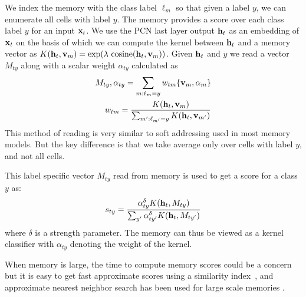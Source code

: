 \documentclass[letterpaper]{article} %
\newcommand{\vek}[1]{{\bf {#1}}}
\newcommand{\vx}{{\vek{x}}}
\newcommand{\vh}{{\vek{h}}}
\newcommand{\vM}{{\vek{v}}}
\newcommand{\util}{{\alpha}}
\newcommand{\lmm}{{s}}
\begin{document}
We index the memory with the class label $\ell_m$  so that given a label $y$, we can enumerate all cells with label $y$.  The memory provides a score over each class label $y$ for an input $\vx_t$.
We use the PCN last layer output $\vh_t$ as an embedding of $\vx_t$ on the basis of which we can compute the kernel  between $\vh_t$ and a memory vector as  $K(\vh_t,\vM_m) = \exp(\lambda ~\text{cosine}(\vh_t,\vM_m))$.
%
Given $\vh_t$ and $y$ we read a vector $M_{ty}$ along with a scalar weight $\alpha_{ty}$ calculated as
\begin{equation}
\label{eq-mem-read}
\begin{split}
 M_{ty},\alpha_{ty} = \sum_{m:\ell_m = y} w_{tm}\{\vM_m,\util_m\} \\
 w_{tm} =  \frac{K(\vh_t,\vM_m)}{\sum_{m': \ell_{m'} = y} K(\vh_t,\vM_{m'}) }
\end{split}
\end{equation}
This method of reading is very similar to soft addressing used in most memory models.  But the key difference is that we take average only over cells with label $y$, and not all cells.


This label specific vector $M_{ty}$ read from memory is used to get a score for a class $y$ as:
\begin{equation}
\label{eq-mem-score}
\lmm_{ty}  = \frac{\alpha_{ty}^\delta K(\vh_t, M_{ty})} { \sum_{y'} \alpha_{ty'}^\delta K(\vh_t, M_{ty'})}
\end{equation}
where $\delta$ is a strength parameter. The memory can thus be viewed as a kernel classifier with $\alpha_{ty}$ denoting the weight of the kernel.


When memory is large, the time to compute memory scores could be a concern but it is easy to get fast approximate scores using a similarity index~\cite{Guo16,kaiser2017}, and approximate nearest neighbor search has been used for large scale memories \cite{RaeHHDSWGL16,chandarSHPGY16}.
\end{document}

